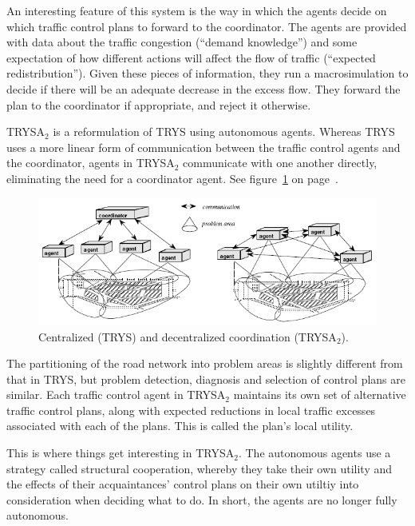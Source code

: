 \documentclass[11pt,letterpaper,onecolumn,twoside,openright,draft]{report}
\begin{document}
An interesting feature of this system is the way in which the agents decide on which traffic control plans to forward to the coordinator.
The agents are provided with data about the traffic congestion (``demand knowledge'') and some expectation of how different actions will affect the flow of traffic (``expected redistribution'').
Given these pieces of information, they run a macrosimulation to decide if there will be an adequate decrease in the excess flow.
They forward the plan to the coordinator if appropriate, and reject it otherwise.

TRYSA$_{2}$ is a reformulation of TRYS using autonomous agents.
Whereas TRYS uses a more linear form of communication between the traffic control agents and the coordinator, agents in TRYSA$_{2}$ communicate with one another directly, eliminating the need for a coordinator agent.
See figure~\ref{fig:TRYS-and-TRYSA2} on page~\pageref{fig:TRYS-and-TRYSA2}.

\begin{figure}[h]
  \includegraphics{figures/TRYS-and-TRYSA2.PNG}
  \caption{Centralized (TRYS) and decentralized coordination (TRYSA$_{2}$).}
  \label{fig:TRYS-and-TRYSA2}
\end{figure}

The partitioning of the road network into problem areas is slightly different from that in TRYS, but problem detection, diagnosis and selection of control plans are similar.
Each traffic control agent in TRYSA$_{2}$ maintains its own set of alternative traffic control plans, along with expected reductions in local traffic excesses associated with each of the plans.
This is called the plan's local utility.

This is where things get interesting in TRYSA$_{2}$.
The autonomous agents use a strategy called structural cooperation\cite{ossowski1999}, whereby they take their own utility and the effects of their acquaintances' control plans on their own utiltiy into consideration when deciding what to do.
In short, the agents are no longer fully autonomous.
\end{document}
